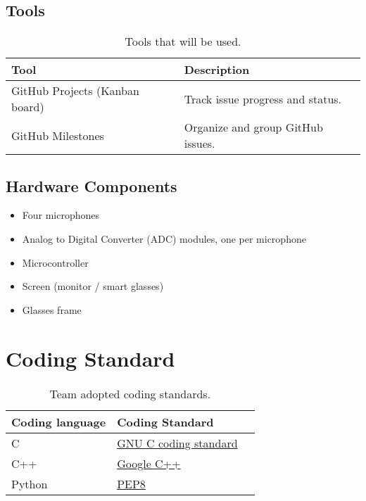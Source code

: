 \documentclass{article}
\begin{document}
\subsection{Tools}
\begin{table}[h!]
\centering
\begin{tabularx}{\textwidth}{|l|X|}
\hline
\textbf{Tool} & \textbf{Description} \\ \hline
GitHub Projects (Kanban board) & Track issue progress and status. \\ \hline
GitHub Milestones & Organize and group GitHub issues. \\ \hline
\end{tabularx}
\caption{Tools that will be used.}
\end{table}

\subsection{Hardware Components}
\begin{itemize}
  \item Four microphones
  \item Analog to Digital Converter (ADC) modules, one per microphone
  \item Microcontroller
  \item Screen (monitor / smart glasses)
  \item Glasses frame
\end{itemize}


\section{Coding Standard}\label{sec:coding_standards}

\begin{table}[h!]
\centering
\begin{tabularx}{\textwidth}{|l|X|X|}
\hline
\textbf{Coding language} & \textbf{Coding Standard} \\ \hline
C & \href{https://www.gnu.org/prep/standards/html_node/Writing-C.html}{GNU C
coding standard} \\ \hline
C++ & \href{https://google.github.io/styleguide/cppguide.html}{Google C++} \\
\hline
Python & \href{https://peps.python.org/pep-0008/}{PEP8} \\ \hline
\end{tabularx}
\caption{Team adopted coding standards.}
\end{table}
\end{document}
